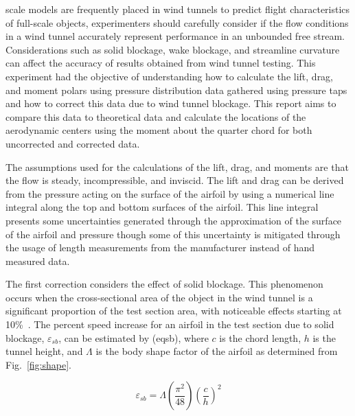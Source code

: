 \documentclass[journal,letterpaper]{IEEEtran}
\begin{document}
 scale models are frequently placed in wind tunnels to predict flight characteristics of full-scale objects, experimenters should carefully consider if the flow conditions in a wind tunnel accurately represent performance in an unbounded free stream.
Considerations such as solid blockage, wake blockage, and streamline curvature can affect the accuracy of results obtained from wind tunnel testing.
This experiment had the objective of understanding how to calculate the lift, drag, and moment polars using pressure distribution data gathered using pressure taps and how to correct this data due to wind tunnel blockage.
This report aims to compare this data to theoretical data and calculate the locations of the aerodynamic centers using the moment about the quarter chord for both uncorrected and corrected data.

The assumptions used for the calculations of the lift, drag, and moments are that the flow is steady, incompressible, and inviscid.
The lift and drag can be derived from the pressure acting on the surface of the airfoil by using a numerical line integral along the top and bottom surfaces of the airfoil.
This line integral presents some uncertainties generated through the approximation of the surface of the airfoil and pressure though some of this uncertainty is mitigated through the usage of length measurements from the manufacturer instead of hand measured data.

The first correction considers the effect of solid blockage.
This phenomenon occurs when the cross-sectional area of the object in the wind tunnel is a significant proportion of the test section area, with noticeable effects starting at 10\%~\cite{lab5r1}.
The percent speed increase for an airfoil in the test section due to solid blockage, $\varepsilon_{sb}$, can be estimated by (eqsb), where $c$ is the chord length, $h$ is the tunnel height, and $\Lambda$ is the body shape factor of the airfoil as determined from Fig.~\ref{fig:shape}.

\begin{equation}
    \varepsilon_{sb} = \Lambda\left(\frac{\pi^2}{48}\right)\left(\frac{c}{h}\right)^2
\end{equation}
\end{document}

